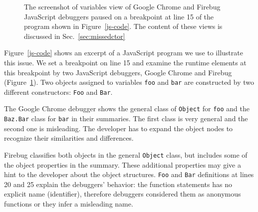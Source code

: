 \documentclass[10pt, preprint]{sigplanconf}
\begin{document}
\begin{figure}[htp]
\centerline{
\hfil
{}}
\caption{The screenshot of variables view of Google Chrome and Firebug JavaScript debuggers paused on a breakpoint at line 15 of the program shown in Figure~\ref{js-code}. The content of these views is discussed in Sec.~\ref{sec:missedctor} }
\label{debuggers-objects}
\end{figure}


Figure~\ref{js-code} shows an excerpt of a JavaScript program we use to illustrate this issue. We set a breakpoint on line 15 and examine the runtime elements at this breakpoint by two JavaScript debuggers, Google Chrome and Firebug (Figure~\ref{debuggers-objects}). Two objects assigned to variables \verb|foo| and \verb|bar| are constructed by two different constructors: \verb|Foo| and \verb|Bar|. 

The Google Chrome debugger shows the general class of \verb|Object| for \verb|foo| and the \verb|Baz.Bar| class for \verb|bar| in their summaries. The first class is very general and the second one is misleading. The developer has to expand the object nodes to recognize their similarities and differences. 

Firebug classifies both objects in the general \verb|Object| class, but includes some of the object properties in the summary. These additional properties may give a hint to the developer about the object structures. \verb|Foo| and \verb|Bar| definitions at lines 20 and 25 explain the debuggers' behavior: the function statements has no explicit name (identifier), therefore debuggers considered them as anonymous functions or they infer a misleading name.
 
\end{document}
